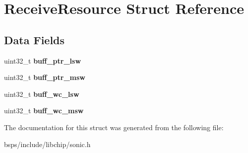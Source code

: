 \hypertarget{structReceiveResource}{}\section{Receive\+Resource Struct Reference}
\label{structReceiveResource}
\subsection*{Data Fields}
\begin{DoxyCompactItemize}
\item 
\mbox{\label{structReceiveResource_a35b967e0f22629d5b06e0d6dd7263e9d}} 
uint32\+\_\+t {\bfseries buff\+\_\+ptr\+\_\+lsw}
\item 
\mbox{\label{structReceiveResource_a02ad9b08ac92ea04d95d712bf55c9ca3}} 
uint32\+\_\+t {\bfseries buff\+\_\+ptr\+\_\+msw}
\item 
\mbox{\label{structReceiveResource_a392b7801dd8ce89249585c8da247331d}} 
uint32\+\_\+t {\bfseries buff\+\_\+wc\+\_\+lsw}
\item 
\mbox{\label{structReceiveResource_a59ebf5860ccfe6fe56c8f14c56d6121e}} 
uint32\+\_\+t {\bfseries buff\+\_\+wc\+\_\+msw}
\end{DoxyCompactItemize}


The documentation for this struct was generated from the following file\+:\begin{DoxyCompactItemize}
\item 
bsps/include/libchip/sonic.\+h\end{DoxyCompactItemize}
